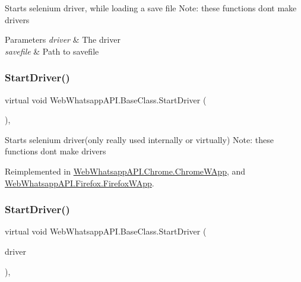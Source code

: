 Starts selenium driver, while loading a save file Note\+: these functions don\textquotesingle{}t make drivers 


\begin{DoxyParams}{Parameters}
{\em driver} & The driver\\
\hline
{\em savefile} & Path to savefile\\
\hline
\end{DoxyParams}
\mbox{\label{class_web_whatsapp_a_p_i_1_1_base_class_a8108d46b4176fc74fb49626e8122df88}} 
\subsubsection{\texorpdfstring{Start\+Driver()}{StartDriver()}\hspace{0.1cm}{\footnotesize\ttfamily [2/3]}}
{\footnotesize\ttfamily virtual void Web\+Whatsapp\+A\+P\+I.\+Base\+Class.\+Start\+Driver (\begin{DoxyParamCaption}{ }\end{DoxyParamCaption})\hspace{0.3cm}{\ttfamily [inline]}, {\ttfamily [virtual]}}



Starts selenium driver(only really used internally or virtually) Note\+: these functions don\textquotesingle{}t make drivers 



Reimplemented in \hyperlink{class_web_whatsapp_a_p_i_1_1_chrome_1_1_chrome_w_app_a2ed5da636b9baf0766bd6804739a9bfb}{Web\+Whatsapp\+A\+P\+I.\+Chrome.\+Chrome\+W\+App}, and \hyperlink{class_web_whatsapp_a_p_i_1_1_firefox_1_1_firefox_w_app_a80f406639e59bc4152b8f255962607f2}{Web\+Whatsapp\+A\+P\+I.\+Firefox.\+Firefox\+W\+App}.

\mbox{\label{class_web_whatsapp_a_p_i_1_1_base_class_a3a26ad50a4ba508f1162402bc00e128b}} 
\subsubsection{\texorpdfstring{Start\+Driver()}{StartDriver()}\hspace{0.1cm}{\footnotesize\ttfamily [3/3]}}
{\footnotesize\ttfamily virtual void Web\+Whatsapp\+A\+P\+I.\+Base\+Class.\+Start\+Driver (\begin{DoxyParamCaption}\item[{I\+Web\+Driver}]{driver }\end{DoxyParamCaption})\hspace{0.3cm}{\ttfamily [inline]}, {\ttfamily [virtual]}}



